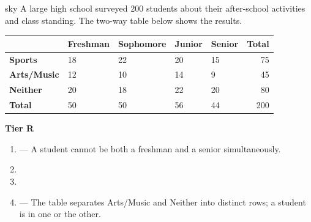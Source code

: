 \documentclass[10pt]{article}
\begin{document}
\namepartnerperiod

\vspace{0.1in}

\begin{scenariobox}[Context]{sky}
\small
A large high school surveyed 200 students about their after-school activities and
class standing. The two-way table below shows the results.

\vspace{6pt}
\renewcommand{\arraystretch}{1.4}
\begin{tabularx}{\linewidth}{@{} l *{4}{X} r @{}}
 & \textbf{Freshman} & \textbf{Sophomore} & \textbf{Junior} & \textbf{Senior} & \textbf{Total} \\
\hline
\textbf{Sports}    & 18 & 22 & 20 & 15 & 75  \\
\textbf{Arts/Music}& 12 & 10 & 14 & 9  & 45  \\
\textbf{Neither}   & 20 & 18 & 22 & 20 & 80  \\
\hline
\textbf{Total}     & 50 & 50 & 56 & 44 & 200 \\
\end{tabularx}
\end{scenariobox}

\vspace{0.12in}

\textbf{Tier R}
\begin{practicebox}
\small
\begin{enumerate}[leftmargin=1.5em, itemsep=6pt]
  \item {} \quad {} --- A student cannot be both a freshman and a senior simultaneously.
  \item {} \quad {}
  \item {} \quad {}
  \item {} --- The table separates Arts/Music and Neither into distinct rows; a student is in one or the other.
\end{enumerate}
\end{practicebox}

\vspace{0.08in}
\end{document}
